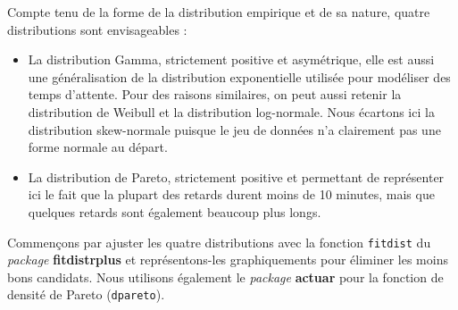 \documentclass[
  11pt,
  french,
]{book}
\providecommand{\tightlist}{%
  \setlength{\itemsep}{0pt}\setlength{\parskip}{0pt}}
\begin{document}
Compte tenu de la forme de la distribution empirique et de sa nature, quatre distributions sont envisageables :

\begin{itemize}
\tightlist
\item
  La distribution Gamma, strictement positive et asymétrique, elle est aussi une généralisation de la distribution exponentielle utilisée pour modéliser des temps d'attente. Pour des raisons similaires, on peut aussi retenir la distribution de Weibull et la distribution log-normale. Nous écartons ici la distribution skew-normale puisque le jeu de données n'a clairement pas une forme normale au départ.
\item
  La distribution de Pareto, strictement positive et permettant de représenter ici le fait que la plupart des retards durent moins de 10 minutes, mais que quelques retards sont également beaucoup plus longs.
\end{itemize}

Commençons par ajuster les quatre distributions avec la fonction \texttt{fitdist} du \emph{package} \textbf{fitdistrplus} et représentons-les graphiquements pour éliminer les moins bons candidats. Nous utilisons également le \emph{package} \textbf{actuar} pour la fonction de densité de Pareto (\texttt{dpareto}).
\end{document}
